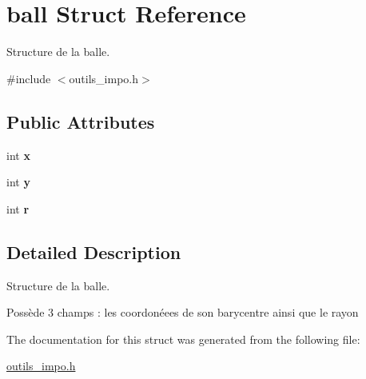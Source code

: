 \hypertarget{structball}{\section{ball Struct Reference}
\label{structball}
}


Structure de la balle.  




{\ttfamily \#include $<$outils\-\_\-impo.\-h$>$}

\subsection*{Public Attributes}
\begin{DoxyCompactItemize}
\item 
\hypertarget{structball_a09a8961fc7d8d508d2f0788e5c90d7fe}{int {\bfseries x}}\label{structball_a09a8961fc7d8d508d2f0788e5c90d7fe}

\item 
\hypertarget{structball_add1d5ee497a6bc9a2290a7d14f6865ea}{int {\bfseries y}}\label{structball_add1d5ee497a6bc9a2290a7d14f6865ea}

\item 
\hypertarget{structball_ae0067c6a0b7331de71209d14f0d9a488}{int {\bfseries r}}\label{structball_ae0067c6a0b7331de71209d14f0d9a488}

\end{DoxyCompactItemize}


\subsection{Detailed Description}
Structure de la balle. 

Possède 3 champs \-: les coordonéees de son barycentre ainsi que le rayon 

The documentation for this struct was generated from the following file\-:\begin{DoxyCompactItemize}
\item 
\hyperlink{outils__impo_8h}{outils\-\_\-impo.\-h}\end{DoxyCompactItemize}
